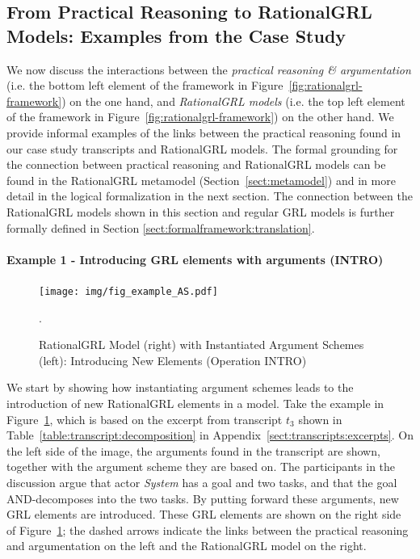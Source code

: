 \subsection{From Practical Reasoning to RationalGRL Models: Examples from the Case Study}
\label{sect:overview:examples}

We now discuss the interactions between the \emph{practical reasoning \& argumentation} (i.e. the bottom left element of the framework in Figure~\ref{fig:rationalgrl-framework}) on the one hand, and \emph{RationalGRL models} (i.e. the top left element of the framework in Figure~\ref{fig:rationalgrl-framework}) on the other hand. We provide informal examples of the links between the practical reasoning found in our case study transcripts and RationalGRL models. The formal grounding for the connection between practical reasoning and RationalGRL models can be found in the RationalGRL metamodel (Section~\ref{sect:metamodel}) and in more detail in the logical formalization in the next section. The connection between the RationalGRL models shown in this section and regular GRL models is further formally defined in Section \ref{sect:formalframework:translation}. 

\paragraph{Example 1 - Introducing GRL elements with arguments (\textsf{INTRO)}}

\begin{figure}[t]
\centering
\texttt{[image: img/fig\_example\_AS.pdf]}
\caption{RationalGRL Model (right) with Instantiated Argument Schemes (left): Introducing New Elements (Operation \textsf{INTRO)}}. 
\label{fig:example_AS}
\end{figure}

We start by showing how instantiating argument schemes leads to the introduction of new RationalGRL elements in a model. Take the example in Figure~\ref{fig:example_AS}, which is based on the excerpt from transcript $t_3$ shown in Table~\ref{table:transcript:decomposition} in Appendix~\ref{sect:transcripts:excerpts}. On the left side of the image, the arguments found in the transcript are shown, together with the argument scheme they are based on. The participants in the discussion argue that actor \emph{System} has a goal and two tasks, and that the goal AND-decomposes into the two tasks. By putting forward these arguments, new GRL elements are introduced. These GRL elements are shown on the right side of Figure~\ref{fig:example_AS}; the dashed arrows indicate the links between the practical reasoning and argumentation on the left and the RationalGRL model on the right.


